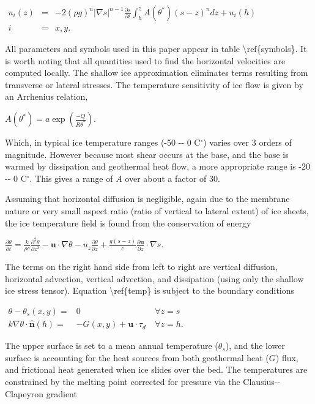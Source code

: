 $\begin{matrix}
u_i(z) &=& -2 (\rho g)^n \vert \nabla s\vert ^{n-1} \frac{\partial s}{\partial i} 
\int_h^z A(\theta^*)(s-z)^n dz + u_i(h)\\
i &=& x,y.
\end{matrix}$

All parameters and symbols used in this paper appear in table
\textbackslash{}ref\{symbols\}. It is worth noting that all quantities
used to find the horizontal velocities are computed locally. The shallow
ice approximation eliminates terms resulting from transverse or lateral
stresses. The temperature sensitivity of ice flow is given by an
Arrhenius relation,

$
A(\theta^*) = a \exp \left(\frac{-Q}{R\theta^*}\right).
$

Which, in typical ice temperature ranges (-50 -{}- 0 C$^\circ$) varies
over 3 orders of magnitude. However because most shear occurs at the
base, and the base is warmed by dissipation and geothermal heat flow, a
more appropriate range is -20 -{}- 0 C$^\circ$. This gives a range of
$A$ over about a factor of 30.

Assuming that horizontal diffusion is negligible, again due to the
membrane nature or very small aspect ratio (ratio of vertical to lateral
extent) of ice sheets, the ice temperature field is found from the
conservation of energy

$ 
\frac{\partial \theta}{\partial t} = \frac{k}{\rho c}
\frac{\partial^2
\theta}{\partial z^2} -
\mathbf{u} \cdot \nabla \theta -
u_z \frac{\partial \theta}{\partial z} 
+ \frac{g(s-z)}{c}\frac{\partial \mathbf{u}}{\partial z} \cdot \nabla s.
$

The terms on the right hand side from left to right are vertical
diffusion, horizontal advection, vertical advection, and dissipation
(using only the shallow ice stress tensor). Equation
\textbackslash{}ref\{temp\} is subject to the boundary conditions

$\begin{matrix}
\theta - \theta_s(x,y) = & 0 &~\forall z=s \\
k \nabla \theta \cdot \mathbf{\hat n}(h) =& -G(x,y) + \mathbf{u} \cdot \tau_d
&~\forall z=h.
\end{matrix}$

The upper surface is set to a mean annual temperature ($\theta_s$), and
the lower surface is accounting for the heat sources from both
geothermal heat ($G$) flux, and frictional heat generated when ice
slides over the bed. The temperatures are constrained by the melting
point corrected for pressure via the Clausius-{}-Clapeyron gradient

